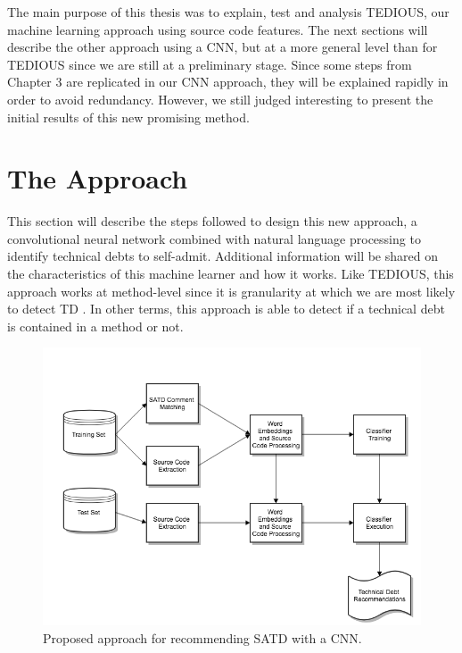 The main purpose of this thesis was to explain, test and analysis TEDIOUS, our machine learning approach using source code features. The next sections will describe the other approach using a CNN, but at a more general level than for TEDIOUS since we are still at a preliminary stage. Since some steps from Chapter 3 are replicated in our CNN approach, they will be explained rapidly in order to avoid redundancy. However, we still judged interesting to present the initial results of this new promising method.

\section{The Approach}


This section will describe the steps followed to design this new approach, a convolutional neural network combined with natural language processing to identify technical debts to self-admit. Additional information will be shared on the characteristics of this machine learner and how it works. Like TEDIOUS, this approach works at method-level since it is granularity at which we are most likely to detect TD \citep{PotdarS14}. In other terms, this approach is able to detect if a technical debt is contained in a method or not.

\begin{figure}[t]
	\centering
	\includegraphics[width=\linewidth]{figs/CNN.png}
	\caption{Proposed approach for recommending SATD with a CNN.}
	\label{fig:CNN}
	\vspace{-4mm}
\end{figure}

